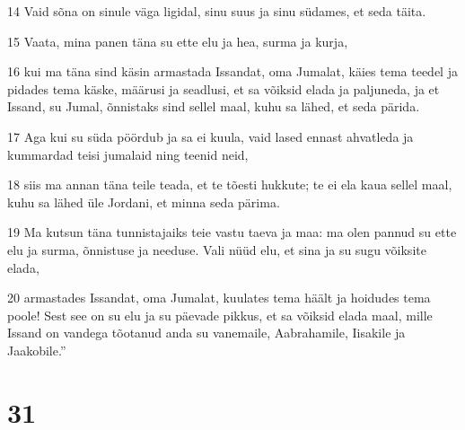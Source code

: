 \par 14 Vaid sõna on sinule väga ligidal, sinu suus ja sinu südames, et seda täita.
\par 15 Vaata, mina panen täna su ette elu ja hea, surma ja kurja,
\par 16 kui ma täna sind käsin armastada Issandat, oma Jumalat, käies tema teedel ja pidades tema käske, määrusi ja seadlusi, et sa võiksid elada ja paljuneda, ja et Issand, su Jumal, õnnistaks sind sellel maal, kuhu sa lähed, et seda pärida.
\par 17 Aga kui su süda pöördub ja sa ei kuula, vaid lased ennast ahvatleda ja kummardad teisi jumalaid ning teenid neid,
\par 18 siis ma annan täna teile teada, et te tõesti hukkute; te ei ela kaua sellel maal, kuhu sa lähed üle Jordani, et minna seda pärima.
\par 19 Ma kutsun täna tunnistajaiks teie vastu taeva ja maa: ma olen pannud su ette elu ja surma, õnnistuse ja needuse. Vali nüüd elu, et sina ja su sugu võiksite elada,
\par 20 armastades Issandat, oma Jumalat, kuulates tema häält ja hoidudes tema poole! Sest see on su elu ja su päevade pikkus, et sa võiksid elada maal, mille Issand on vandega tõotanud anda su vanemaile, Aabrahamile, Iisakile ja Jaakobile.”

\chapter{31}

